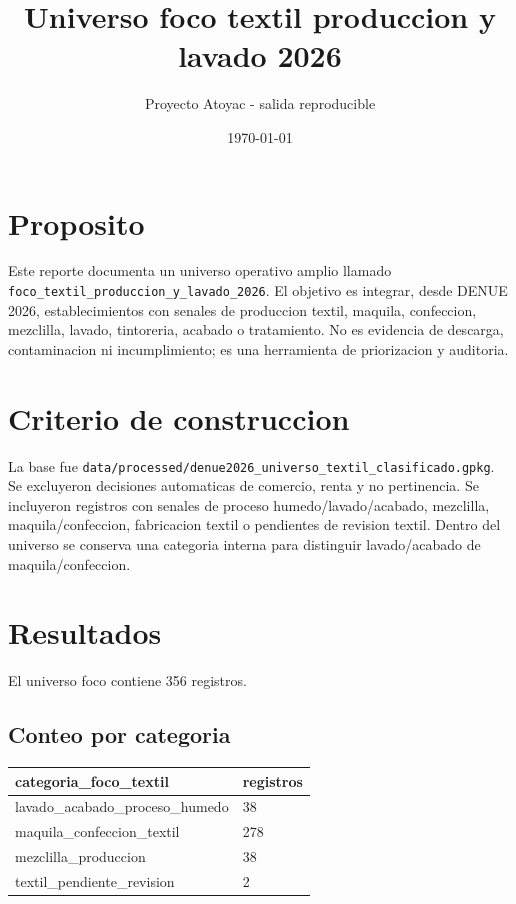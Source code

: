 \documentclass[11pt]{article}
\title{Universo foco textil produccion y lavado 2026}
\author{Proyecto Atoyac - salida reproducible}
\date{\today}
\begin{document}
\maketitle

\section{Proposito}

Este reporte documenta un universo operativo amplio llamado \texttt{foco\_textil\_produccion\_y\_lavado\_2026}. El objetivo es integrar, desde DENUE 2026, establecimientos con senales de produccion textil, maquila, confeccion, mezclilla, lavado, tintoreria, acabado o tratamiento. No es evidencia de descarga, contaminacion ni incumplimiento; es una herramienta de priorizacion y auditoria.

\section{Criterio de construccion}

La base fue \texttt{data/processed/denue2026\_universo\_textil\_clasificado.gpkg}. Se excluyeron decisiones automaticas de comercio, renta y no pertinencia. Se incluyeron registros con senales de proceso humedo/lavado/acabado, mezclilla, maquila/confeccion, fabricacion textil o pendientes de revision textil. Dentro del universo se conserva una categoria interna para distinguir lavado/acabado de maquila/confeccion.

\section{Resultados}

El universo foco contiene 356 registros.

\subsection{Conteo por categoria}

\begin{tabular}{ll}
\toprule
categoria\_foco\_textil & registros \\
\midrule
lavado\_acabado\_proceso\_humedo & 38 \\
maquila\_confeccion\_textil & 278 \\
mezclilla\_produccion & 38 \\
textil\_pendiente\_revision & 2 \\
\bottomrule
\end{tabular}
\end{document}
